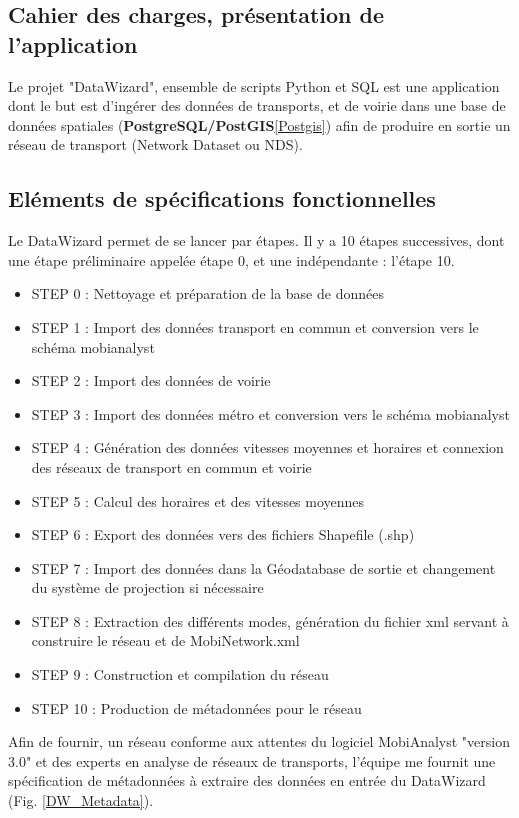 \begin{itemize}
\subsection{Cahier des charges, présentation de l'application}

Le projet "DataWizard", ensemble de scripts Python et SQL est une application dont le but est d'ingérer des données de transports, et de voirie dans une base de données spatiales (\textbf{PostgreSQL/PostGIS}\ref{Postgis}) afin de produire en sortie un réseau de transport (Network Dataset ou NDS).\\


\subsection{Eléments de spécifications fonctionnelles}

Le DataWizard permet de se lancer par étapes. Il y a 10 étapes successives, dont une étape préliminaire appelée étape 0, et une indépendante : l'étape 10.
\begin{itemize}
\item STEP 0 : Nettoyage et préparation de la base de données
\item STEP 1 : Import des données transport en commun et conversion vers le schéma mobianalyst
\item STEP 2 : Import des données de voirie
\item STEP 3 : Import des données métro et conversion vers le schéma mobianalyst
\item STEP 4 : Génération des données vitesses moyennes et horaires et connexion des réseaux de transport en commun et voirie
\item STEP 5 : Calcul des horaires et des vitesses moyennes
\item STEP 6 : Export des données vers des fichiers Shapefile (.shp)
\item STEP 7 : Import des données dans la Géodatabase de sortie et changement du système de projection si nécessaire
\item STEP 8 : Extraction des différents modes, génération du fichier xml servant à construire le réseau et de MobiNetwork.xml
\item STEP 9 : Construction et compilation du réseau
\item STEP 10 : Production de métadonnées pour le réseau
\end{itemize}

Afin de fournir, un réseau conforme aux attentes du logiciel MobiAnalyst "version 3.0" et des experts en analyse de réseaux de transports, l'équipe me fournit une spécification de métadonnées à extraire des données en entrée du DataWizard (Fig. \ref{DW_Metadata}).\\


\end{itemize}
